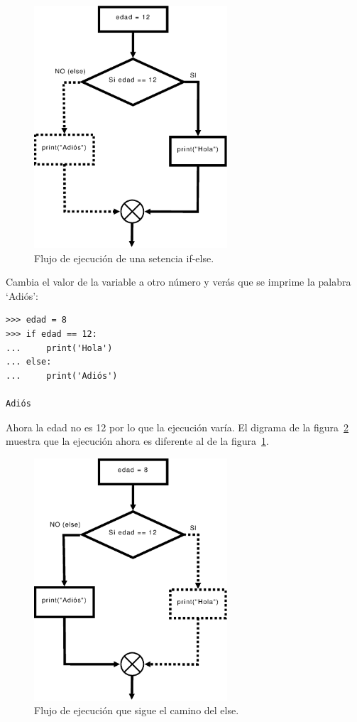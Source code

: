 \begin{figure}
\begin{center}
\includegraphics[width=72mm]{if5.eps}
\end{center}
\caption{Flujo de ejecución de una setencia if-else.}\label{if5}
\end{figure}

Cambia el valor de la variable  a otro número y verás que se imprime la palabra `Adiós':

\begin{listing}
\begin{verbatim}
>>> edad = 8
>>> if edad == 12:
...     print('Hola')
... else:
...     print('Adiós')

Adiós
\end{verbatim}
\end{listing}

Ahora la edad no es 12 por lo que la ejecución varía. El digrama de la figura~\ref{if6} muestra que la ejecución ahora es diferente al de la figura~\ref{if5}.

\begin{figure}
\begin{center}
\includegraphics[width=72mm]{if6.eps}
\end{center}
\caption{Flujo de ejecución que sigue el camino del else.}\label{if6}
\end{figure}

